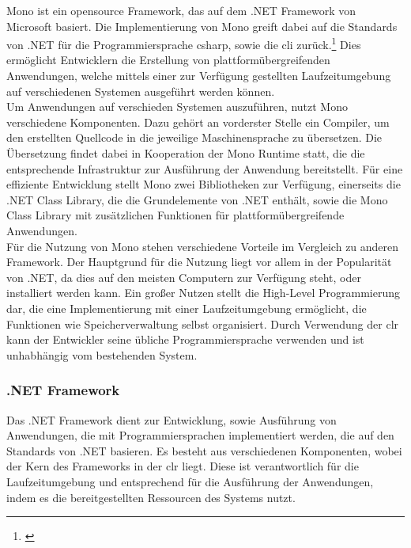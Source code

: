 Mono ist ein opensource Framework, das auf dem .NET Framework von Microsoft basiert. Die Implementierung von Mono greift dabei auf die Standards von .NET für die Programmiersprache \gls{csharp}, sowie die \gls{cli} zurück.\footnote{\citep[vgl.][About Mono]{MonoProject.AboutMono}\label{note6}} Dies ermöglicht Entwicklern die Erstellung von plattformübergreifenden Anwendungen, welche mittels einer zur Verfügung gestellten Laufzeitumgebung auf verschiedenen Systemen ausgeführt werden können.\\
Um Anwendungen auf verschieden Systemen auszuführen, nutzt Mono verschiedene Komponenten. Dazu gehört an vorderster Stelle ein Compiler, um den erstellten Quellcode in die jeweilige Maschinensprache zu übersetzen. Die Übersetzung findet dabei in Kooperation der Mono Runtime statt, die die entsprechende Infrastruktur zur Ausführung der Anwendung bereitstellt. Für eine effiziente Entwicklung stellt Mono zwei Bibliotheken zur Verfügung, einerseits die .NET Class Library, die die Grundelemente von .NET enthält, sowie die Mono Class Library mit zusätzlichen Funktionen für plattformübergreifende Anwendungen.\\
Für die Nutzung von Mono stehen verschiedene Vorteile im Vergleich zu anderen Framework. Der Hauptgrund für die Nutzung liegt vor allem in der Popularität von .NET, da dies auf den meisten Computern zur Verfügung steht, oder installiert werden kann. Ein großer Nutzen stellt die High-Level Programmierung dar, die eine Implementierung mit einer Laufzeitumgebung ermöglicht, die Funktionen wie Speicherverwaltung selbst organisiert. Durch Verwendung der \gls{clr} kann der Entwickler seine übliche Programmiersprache verwenden und ist unhabhängig vom bestehenden System.

\subsubsection{.NET Framework}\label{net}

Das .NET Framework dient zur Entwicklung, sowie Ausführung von Anwendungen, die mit Programmiersprachen implementiert werden, die auf den Standards von .NET basieren. Es besteht aus verschiedenen Komponenten, wobei der Kern des Frameworks in der \gls{clr} liegt. Diese ist verantwortlich für die Laufzeitumgebung und entsprechend für die Ausführung der Anwendungen, indem es die bereitgestellten Ressourcen des Systems nutzt.\\

